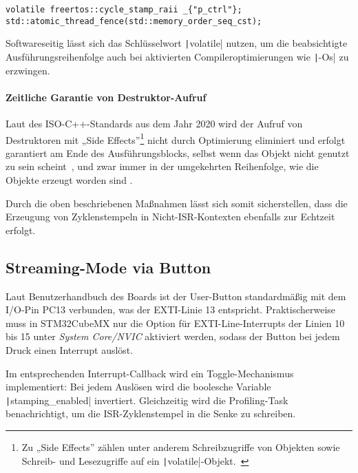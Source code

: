 \begin{code}
\begin{verbatim}
volatile freertos::cycle_stamp_raii _{"p_ctrl"};
std::atomic_thread_fence(std::memory_order_seq_cst);
\end{verbatim}
\end{code}

Softwareseitig lässt sich das Schlüsselwort \texttt|volatile| nutzen,
um die beabsichtigte Ausführungsreihenfolge auch bei aktivierten
Compileroptimierungen wie \texttt|-Os| zu erzwingen.

\paragraph{Zeitliche Garantie von Destruktor-Aufruf}

Laut des ISO-C++-Standards aus dem Jahr 2020 wird der Aufruf von Destruktoren
mit „Side Effects”\footnote{Zu „Side Effects” zählen unter anderem
Schreibzugriffe von Objekten sowie Schreib- und Lesezugriffe auf ein
\texttt|volatile|-Objekt.~\cite{cppreference_eval_order}} nicht durch
Optimierung eliminiert und erfolgt garantiert am Ende des Ausführungsblocks,
selbst wenn das Objekt nicht genutzt zu sein scheint~\cite[§6.7.5.4 Abs.
3]{iso_iec_14882_2020}, und zwar immer in der umgekehrten Reihenfolge, wie die
Objekte erzeugt worden sind \cite{isocpp_dtor_order}.

Durch die oben beschriebenen Maßnahmen lässt sich somit sicherstellen, dass die
Erzeugung von Zyklenstempeln in Nicht-ISR-Kontexten ebenfalls zur Echtzeit
erfolgt.

\subsection{Streaming-Mode via Button}

Laut Benutzerhandbuch des Boards ist der User-Button standardmäßig mit dem
I/O-Pin PC13 verbunden, was der EXTI-Linie 13 entspricht. Praktischerweise muss
in STM32CubeMX nur die Option für EXTI-Line-Interrupts der Linien 10 bis 15
unter \textit{System Core/NVIC} aktiviert werden, sodass der Button bei jedem
Druck einen Interrupt auslöst.

Im entsprechenden Interrupt-Callback wird ein Toggle-Mechanismus implementiert:
Bei jedem Auslösen wird die boolesche Variable
\texttt|stamping_enabled| invertiert. Gleichzeitig wird die
Profiling-Task benachrichtigt, um die ISR-Zyklenstempel in die Senke zu
schreiben.

